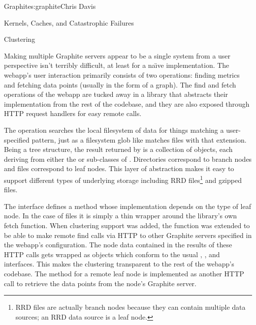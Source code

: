 \begin{aosachapter}{Graphite}{s:graphite}{Chris Davis}
\begin{aosasect1}{Kernels, Caches, and Catastrophic Failures}
\end{aosasect1}

\begin{aosasect1}{Clustering}

Making multiple Graphite servers appear to be a single system from
a user perspective isn't terribly difficult, at least for a na\"{\i}ve
implementation.  The webapp's user interaction primarily consists of
two operations: finding metrics and fetching data points (usually in
the form of a graph). The find and fetch operations of the webapp are
tucked away in a library that abstracts their implementation from the
rest of the codebase, and they are also exposed through HTTP request
handlers for easy remote calls.

The  operation searches the local filesystem of 
data for things matching a user-specified pattern, just as a filesystem
glob like  matches files with that extension.
Being a tree structure, the result returned by  is a
collection of  objects, each deriving from either the  or
 sub-classes of . Directories correspond to branch nodes and
 files correspond to leaf nodes.  This layer of abstraction
makes it easy to support different types of underlying storage
including RRD files\footnote{RRD files are actually branch nodes
because they can contain multiple data sources; an RRD data source
is a leaf node.} and gzipped  files.

The  interface defines a  method whose
implementation depends on the type of leaf node. In the case of
 files it is simply a thin wrapper around the  library's
own fetch function.  When clustering support was added, the
 function was extended to be able to make remote find calls
via HTTP to other Graphite servers specified in the webapp's
configuration. The node data contained in the results of these HTTP
calls gets wrapped as  objects which conform to the usual
, , and  interfaces. This makes the clustering
transparent to the rest of the webapp's codebase. The 
method for a remote leaf node is implemented as another HTTP call to
retrieve the data points from the node's Graphite server.


\end{aosasect1}
\end{aosachapter}
